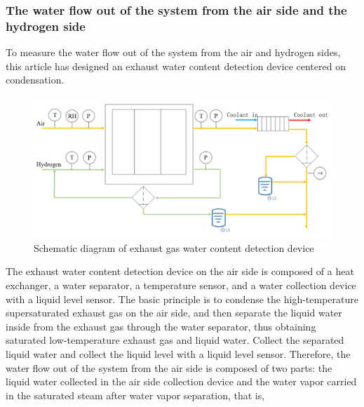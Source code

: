 \subsubsection{The water flow out of the system from the air side and the hydrogen side}
To measure the water flow out of the system from the air and hydrogen sides, this article has designed an exhaust water content detection device centered on condensation.
\begin{figure}
	\centering

	\includegraphics[scale=0.6]{Research_pictures/picture3.png}
	\caption[short]{Schematic diagram of exhaust gas water content detection device}
	\label{fig:water_detection_device_diagram}
\end{figure}
The exhaust water content detection device on the air side is composed of a heat exchanger, a water separator, a temperature sensor, and a water collection device with a liquid level sensor. The basic principle is to condense the high-temperature supersaturated exhaust gas on the air side, and then separate the liquid water inside from the exhaust gas through the water separator, thus obtaining saturated low-temperature exhaust gas and liquid water. Collect the separated liquid water and collect the liquid level with a liquid level sensor.
Therefore, the water flow out of the system from the air side is composed of two parts: the liquid water collected in the air side collection device and the water vapor carried in the saturated steam after water vapor separation, that is,
